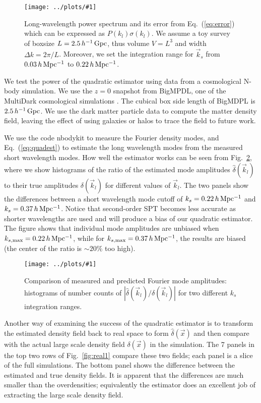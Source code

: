 \documentclass[prd,amsmath,amssymb,floatfix,superscriptaddress,nofootinbib,twocolumn]{revtex4-1}
\newcommand{\vk}{\vec{k}}
\newcommand{\ec}[1]{Eq.~(\ref{eq:#1})}
\newcommand{\rf}[1]{\ref{fig:#1}}
\newcommand{\sfig}[2]{
\texttt{[image: ../plots/\#1]}
        }
\newcommand{\Sfig}[2]{
   \begin{figure}[thbp]
   \begin{center}
    \sfig{../plots/#1.pdf}{\columnwidth}
    \caption{{\small #2}}
    \label{fig:#1}
     \end{center}
   \end{figure}
}
\begin{document}
\Sfig{SN}{Long-wavelength power spectrum and its error from \ec{error} which can be expressed as $P(k_l)\sigma(k_l)$. We assume a toy survey of boxsize $L=2.5\, h^{-1}\rm\, Gpc$, thus volume $V=L^3$ and width $\Delta k = 2\pi/L$. Moreover, we set the integration range for $\vk_s$ from $0.03 \,h \,\rm Mpc^{-1}$ to $0.22\,h\,\rm Mpc^{-1}$.}


\label{sec3}
We test the power of the quadratic estimator using data from a cosmological N-body simulation. We use the $z=0$ snapshot from BigMPDL, one of the MultiDark cosmological simulations \cite{Klypin:2014nov}. The cubical box side length of BigMDPL is $2.5\,h^{-1}\,\rm Gpc$. We use the dark matter particle data to compute the matter density field, leaving the effect of using galaxies or halos to trace the field \cite{Desjacques:2018rev} to  future work.

We use the code nbodykit \cite{Hand:2018nby} to measure the Fourier density modes, and \ec{quadest} to estimate the long wavelength modes  from the measured short wavelength modes. How well the estimator works can be seen from Fig.~\rf{hist}, where we show histograms of the ratio of the estimated mode amplitudes $\hat{\delta}(\vk_l)$ to their true amplitudes $\delta(\vk_l)$ for different values of $\vk_l$. The two panels show the differences between a short wavelength mode cutoff of $k_s=0.22\, h\, \rm Mpc^{-1}$ and  $k_s=0.37\,h\, \rm Mpc^{-1}$. Notice that second-order SPT becomes less accurate as shorter wavelengths are used and will produce a bias of our quadratic estimator. The figure shows that individual mode amplitudes are  unbiased when $k_{s,\rm max}= 0.22\,h\, \rm Mpc^{-1}$, while for $k_{s,\rm max}=0.37\,h\, \rm Mpc^{-1}$, the results are biased (the center of the ratio is $\sim 20 \%$ too high).
\Sfig{hist}{Comparison of measured and predicted Fourier mode amplitudes: histograms of number counts of $|\hat{\delta}(\vk_l)/\delta(\vk_l)|$ for two different $k_s$ integration ranges.}

Another way of examining the success of the quadratic estimator is to transform the estimated density field back to real space to form $\hat\delta(\vec x)$ and then compare with the actual large scale density field $\delta(\vec x)$ in the simulation. The 7 panels in the top two rows of Fig.~\rf{real1} compare these two fields; each panel is a slice of the full simulations. The bottom panel shows the difference between the estimated and true density fields. It is apparent that the differences are much smaller than the overdensities; equivalently the estimator does an excellent job of extracting the large scale density field.\\ 
\end{document}
